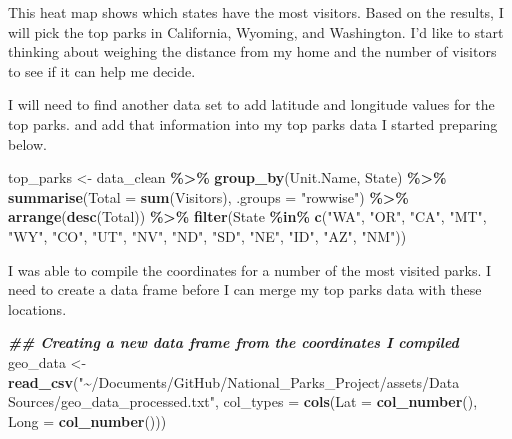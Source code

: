 \documentclass[
]{article}
\newenvironment{Shaded}{\begin{snugshade}}{\end{snugshade}}
\newcommand{\AttributeTok}[1]{\textcolor[rgb]{0.13,0.29,0.53}{#1}}
\newcommand{\DocumentationTok}[1]{\textcolor[rgb]{0.56,0.35,0.01}{\textbf{\textit{#1}}}}
\newcommand{\FunctionTok}[1]{\textcolor[rgb]{0.13,0.29,0.53}{\textbf{#1}}}
\newcommand{\NormalTok}[1]{#1}
\newcommand{\OtherTok}[1]{\textcolor[rgb]{0.56,0.35,0.01}{#1}}
\newcommand{\SpecialCharTok}[1]{\textcolor[rgb]{0.81,0.36,0.00}{\textbf{#1}}}
\newcommand{\StringTok}[1]{\textcolor[rgb]{0.31,0.60,0.02}{#1}}
\begin{document}
This heat map shows which states have the most visitors. Based on the
results, I will pick the top parks in California, Wyoming, and
Washington. I'd like to start thinking about weighing the distance from
my home and the number of visitors to see if it can help me decide.

\label{visitation_trends_parks}
I will need to find another data set to add latitude and longitude
values for the top parks. and add that information into my top parks
data I started preparing below.

\begin{Shaded}
\begin{Highlighting}[]
\NormalTok{top\_parks }\OtherTok{\textless{}{-}}\NormalTok{ data\_clean }\SpecialCharTok{\%\textgreater{}\%}
  \FunctionTok{group\_by}\NormalTok{(Unit.Name, State) }\SpecialCharTok{\%\textgreater{}\%}
  \FunctionTok{summarise}\NormalTok{(}\AttributeTok{Total =} \FunctionTok{sum}\NormalTok{(Visitors), }\AttributeTok{.groups =} \StringTok{"rowwise"}\NormalTok{) }\SpecialCharTok{\%\textgreater{}\%}
  \FunctionTok{arrange}\NormalTok{(}\FunctionTok{desc}\NormalTok{(Total)) }\SpecialCharTok{\%\textgreater{}\%}
  \FunctionTok{filter}\NormalTok{(State }\SpecialCharTok{\%in\%} \FunctionTok{c}\NormalTok{(}\StringTok{"WA"}\NormalTok{, }\StringTok{"OR"}\NormalTok{, }\StringTok{"CA"}\NormalTok{, }\StringTok{"MT"}\NormalTok{, }\StringTok{"WY"}\NormalTok{, }
                      \StringTok{"CO"}\NormalTok{, }\StringTok{"UT"}\NormalTok{, }\StringTok{"NV"}\NormalTok{, }\StringTok{"ND"}\NormalTok{, }\StringTok{"SD"}\NormalTok{, }
                      \StringTok{"NE"}\NormalTok{, }\StringTok{"ID"}\NormalTok{, }\StringTok{"AZ"}\NormalTok{, }\StringTok{"NM"}\NormalTok{))}
\end{Highlighting}
\end{Shaded}

I was able to compile the coordinates for a number of the most visited
parks. I need to create a data frame before I can merge my top parks
data with these locations.

\begin{Shaded}
\begin{Highlighting}[]
  \DocumentationTok{\#\# Creating a new data frame from the coordinates I compiled}
\NormalTok{geo\_data }\OtherTok{\textless{}{-}} \FunctionTok{read\_csv}\NormalTok{(}\StringTok{"\textasciitilde{}/Documents/GitHub/National\_Parks\_Project/assets/Data Sources/geo\_data\_processed.txt"}\NormalTok{, }\AttributeTok{col\_types =} \FunctionTok{cols}\NormalTok{(}\AttributeTok{Lat =} \FunctionTok{col\_number}\NormalTok{(),}
    \AttributeTok{Long =} \FunctionTok{col\_number}\NormalTok{()))}
\end{Highlighting}
\end{Shaded}
\end{document}
